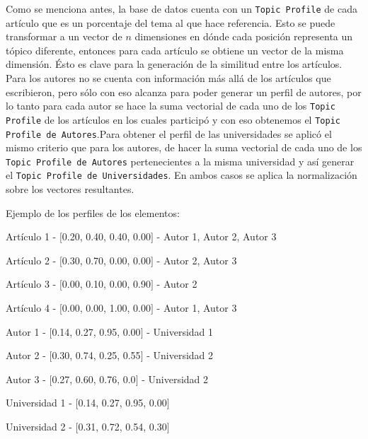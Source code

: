 Como se menciona antes, la base de datos cuenta con un \texttt{Topic Profile} de cada artículo que es un porcentaje del tema al que hace referencia. Esto se puede transformar a un vector de $n$ dimensiones en dónde cada posición representa un tópico diferente, entonces para cada artículo se obtiene un vector de la misma dimensión. Ésto es clave para la generación de la similitud entre los artículos.\\
Para los autores no se cuenta con información más allá de los artículos que escribieron, pero sólo con eso alcanza para poder generar un perfil de autores, por lo tanto para cada autor se hace la suma vectorial de cada uno de los \texttt{Topic Profile} de los artículos en los cuales participó y con eso obtenemos el \texttt{Topic Profile de Autores}.Para obtener el perfil de las universidades se aplicó el mismo criterio que para los autores, de hacer la suma vectorial de cada uno de los \texttt{Topic Profile de Autores} pertenecientes a la misma universidad y así generar el \texttt{Topic Profile de Universidades}. En ambos casos se aplica la normalización sobre los vectores resultantes.

Ejemplo de los perfiles de los elementos:

\begin{description}
 \item[Artículo - Topic Profile - Autores]
 \item Artículo 1 - $[$0.20, 0.40, 0.40, 0.00$]$ - Autor 1, Autor 2, Autor 3
 \item Artículo 2 - $[$0.30, 0.70, 0.00, 0.00$]$ - Autor 2, Autor 3
 \item Artículo 3 - $[$0.00, 0.10, 0.00, 0.90$]$ - Autor 2
 \item Artículo 4 - $[$0.00, 0.00, 1.00, 0.00$]$ - Autor 1, Autor 3
\end{description}

\begin{description}
 \item[Autor - Topic Profile - Universidad]
 \item Autor 1 - $[$0.14, 0.27, 0.95, 0.00$]$ - Universidad 1
 \item Autor 2 - $[$0.30, 0.74, 0.25, 0.55$]$ - Universidad 2
 \item Autor 3 - $[$0.27, 0.60, 0.76, 0.0$]$ - Universidad 2
\end{description}

\begin{description}
 \item[Universidad - Topic Profile]
 \item Universidad 1 - $[$0.14, 0.27, 0.95, 0.00$]$
 \item Universidad 2 - $[$0.31, 0.72, 0.54, 0.30$]$
\end{description}

